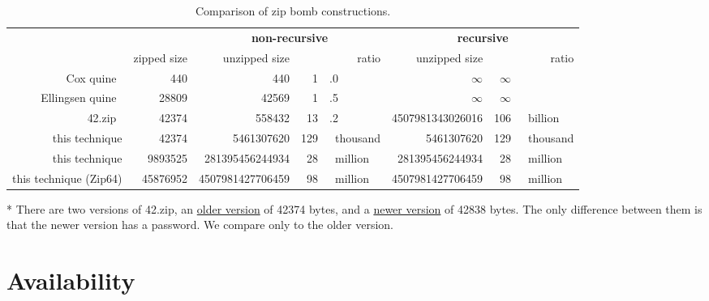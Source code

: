\documentclass[letterpaper,twocolumn,10pt]{article}
\begin{document}
\begin{table*}
\centering
\begin{threeparttable}
\begin{tabular}{rr|rr@{}l|rr@{}l}
&
&
\multicolumn{3}{c|}{\textbf{non-recursive}} &
\multicolumn{3}{c}{\textbf{recursive}}
\\
&
zipped size &
unzipped size &
\multicolumn{2}{r|}{ratio\phantom{~thousand}} &
unzipped size &
\multicolumn{2}{r}{ratio\phantom{~thousand}}
\\
Cox quine~\cite{cox} &
\num{440} &
\num{440} &
\num{1}&.0 &
$\infty$ &
$\infty$&
\\
Ellingsen quine~\cite{ellingsen} &
\num{28809} &
\num{42569} &
\num{1}&.5 &
$\infty$ &
$\infty$&
\\
42.zip~\cite{42.zip} &
\num{42374}\tnote{*} &
\num{558432} &
\num{13}&.2 &
\num{4507981343026016} &
106&~billion
\\
this technique &
\num{42374} &
\num{5461307620} &
129&~thousand &
\num{5461307620} &
129&~thousand
\\
this technique &
\num{9893525} &
\num{281395456244934} &
28&~million &
\num{281395456244934} &
28&~million
\\
this technique (Zip64) &
\num{45876952} &
\num{4507981427706459} &
98&~million &
\num{4507981427706459} &
98&~million
\end{tabular}
\caption{
Comparison of zip bomb constructions.
}
\label{tab:comparison}
\begin{tablenotes}
\item [*]
There are two versions of 42.zip,
an \href{https://web.archive.org/web/20120222083624/http://www.unforgettable.dk/}{older version} of \num{42374} bytes,
and a \href{https://web.archive.org/web/20120301154142/http://www.unforgettable.dk/}{newer version} of \num{42838} bytes.
The only difference between them is that the newer version has a password.
We compare only to the older version.
\end{tablenotes}
\end{threeparttable}
\end{table*}


\section*{Availability}





\end{document}
